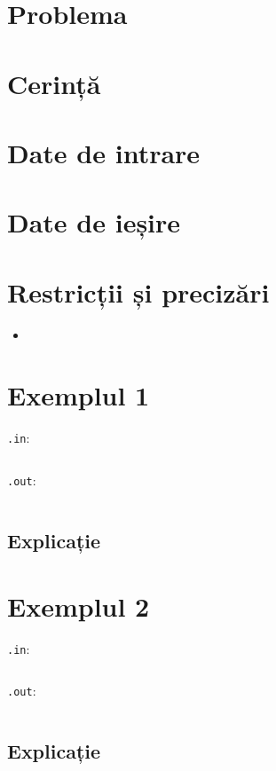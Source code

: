 \documentclass{scrartcl}
\author{Test Tutors of CNMB Informatică}
\date{\today}
\begin{document}
\section*{Problema \texttt{}}

\section*{Cerință}

\section*{Date de intrare}

\section*{Date de ieșire}

\section*{Restricții și precizări}
\begin{itemize}
    \item 
\end{itemize}

{
\parindent0pt
    
\section*{Exemplul 1}
\texttt{.in}:
    \begin{lstlisting}
    \end{lstlisting}

\texttt{.out}:
    \begin{lstlisting}
    \end{lstlisting}

\subsection*{Explicație}

\section*{Exemplul 2}
\texttt{.in}:
    \begin{lstlisting}
    \end{lstlisting}

\texttt{.out}:
    \begin{lstlisting}
    \end{lstlisting}

\subsection*{Explicație}
}
\end{document}

